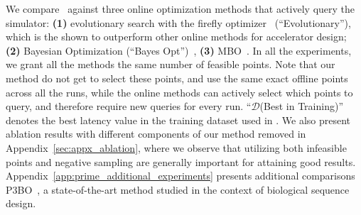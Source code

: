 %
We compare \primemethodname\ against three online optimization methods that actively query the simulator: \textbf{(1)} evolutionary search with the firefly optimizer~\citep{yazdanbakhsh2021apollo} (``Evolutionary''), which is the shown to outperform other online methods for accelerator design; \textbf{(2)} Bayesian Optimization (``Bayes Opt'')~\citep{vizier:sigkdd:2017},
\textbf{(3)} MBO~\citep{angermueller2019model}. 
%
%
In all the experiments, we grant all the methods the same number of feasible points. Note that our method do not get to select these points, and use the same exact offline points across all the runs, while the online methods can actively select which points to query, and therefore require new queries for every run. 
%
``$\mathcal{D}$(Best in Training)'' denotes the best latency value in the training dataset used in \primemethodname. We also present ablation results with different components of our method removed in Appendix~\ref{sec:appx_ablation}, where we observe that utilizing both infeasible points and negative sampling are generally important for attaining good results. 
%
Appendix~\ref{app:prime_additional_experiments} presents additional comparisons P3BO~\citep{p3bo:arxiv:2020}, a state-of-the-art method studied in the context of biological sequence design. 

